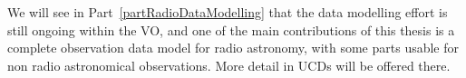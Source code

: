 		 We will see in Part~\ref{partRadioDataModelling} that the
		data modelling effort is still ongoing within the VO, and
		one of the main contributions of this thesis is a complete
		observation data model for radio astronomy, with some parts
		usable for non radio astronomical observations. More detail
		in UCDs will be offered there.

		
		

